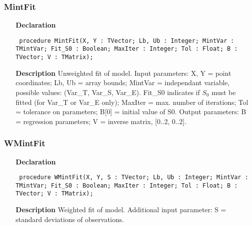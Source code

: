 \documentclass[12pt,a4paper,oneside]{report}
\newcommand{\declarationitem}[1]{\textbf{#1}}
\newcommand{\descriptiontitle}[1]{\textbf{#1}}
\newcommand{\code}[1]{\texttt{#1}}
\begin{document}
\subsubsection{MintFit}
\label{umintfit-MintFit}
\begin{itemize}\item[\declarationitem{Declaration}\hfill]
	\begin{flushleft}
		\code{
			procedure MintFit(X, Y : TVector; Lb, Ub : Integer; MintVar : TMintVar; Fit{\_}S0 : Boolean; MaxIter : Integer; Tol : Float; B : TVector; V : TMatrix);}
		
	\end{flushleft}
	
	\par
	\item[\descriptiontitle{Description}]
	Unweighted fit of model. Input parameters: X, Y = point coordinates; Lb, Ub = array bounds; MintVar = independant variable, possible values: (Var{\_}T, Var{\_}S, Var{\_}E). Fit{\_}S0 indicates if $S_0$ must be fitted (for Var{\_}T or Var{\_}E only); MaxIter = max. number of iterations; Tol = tolerance on parameters; B[0] = initial value of S0. Output parameters: B = regression parameters; V = inverse matrix, [0..2, 0..2].
	
\end{itemize}
\subsubsection{WMintFit}
\label{umintfit-WMintFit}
\begin{itemize}\item[\declarationitem{Declaration}\hfill]
	\begin{flushleft}
		\code{
			procedure WMintFit(X, Y, S : TVector; Lb, Ub : Integer; MintVar : TMintVar; Fit{\_}S0 : Boolean; MaxIter : Integer; Tol : Float; B : TVector; V : TMatrix);}
		
	\end{flushleft}
	
	\par
	\item[\descriptiontitle{Description}]
	Weighted fit of model. Additional input parameter: S = standard deviations of observations.
	
\end{itemize}
\end{document}
